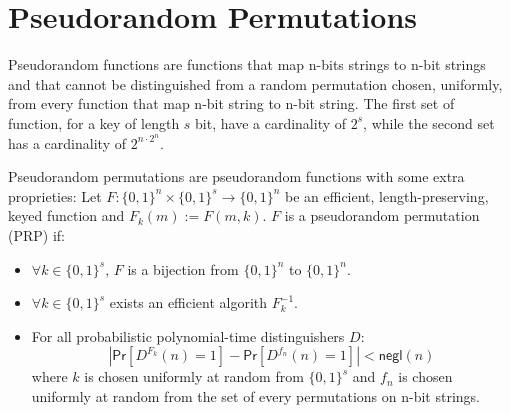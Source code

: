 \section{Pseudorandom Permutations}
Pseudorandom functions are functions that map n-bits strings to n-bit strings and that cannot be distinguished from a random permutation chosen, uniformly, from every function that map n-bit string to n-bit string.
The first set of function, for a key of length $s$ bit, have a cardinality of $2^{s}$, while the second set has a cardinality of $2^{n\cdot2^n}$.\par
Pseudorandom permutations are pseudorandom functions with some extra proprieties:
Let $F : \{0,1\}^{n} \times \{0,1\}^{s} \rightarrow \{0,1\}^{n}$ be an efficient, length-preserving, keyed function and $F_k(m) := F(m, k)$.
$F$ is a pseudorandom permutation (PRP) if:
\begin{itemize}
    \item{$\forall k \in \{0,1\}^{s}$, $F$ is a bijection from $\{0,1\}^{n}$ to $\{0,1\}^{n}$}.
    \item{$\forall k \in \{0,1\}^{s}$ exists an efficient algorith $F^{-1}_k$.}
    \item{For all probabilistic polynomial-time distinguishers $D$:
        $$
            |\mathsf{Pr}[D^{F_k}(n) = 1] - \mathsf{Pr}[D^{f_n}(n) = 1]| < \mathsf{negl}(n)
        $$
        where $k$ is chosen uniformly at random from $\{0,1\}^{s}$ and $f_n$ is chosen uniformly at random from the set of every permutations on n-bit strings.
        }
\end{itemize}

